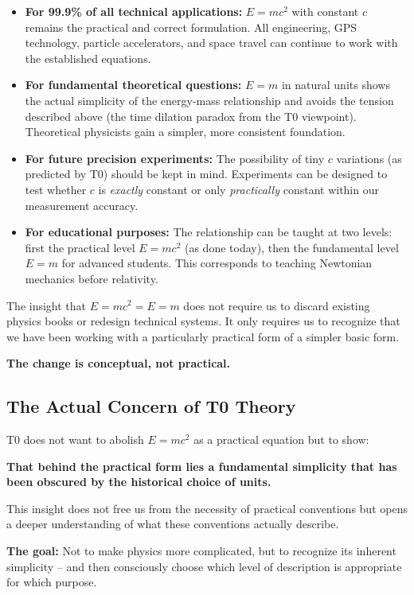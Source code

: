 	\begin{itemize}
		\item \textbf{For 99.9\% of all technical applications:} \( E = mc^2 \) with constant \( c \) remains the practical and correct formulation. All engineering, GPS technology, particle accelerators, and space travel can continue to work with the established equations.
		
		\item \textbf{For fundamental theoretical questions:} \( E = m \) in natural units shows the actual simplicity of the energy-mass relationship and avoids the tension described above (the time dilation paradox from the T0 viewpoint). Theoretical physicists gain a simpler, more consistent foundation.
		
		\item \textbf{For future precision experiments:} The possibility of tiny \( c \) variations (as predicted by T0) should be kept in mind. Experiments can be designed to test whether \( c \) is \textit{exactly} constant or only \textit{practically} constant within our measurement accuracy.
		
		\item \textbf{For educational purposes:} The relationship can be taught at two levels: first the practical level \( E = mc^2 \) (as done today), then the fundamental level \( E = m \) for advanced students. This corresponds to teaching Newtonian mechanics before relativity.
	\end{itemize}
	
	\begin{tcolorbox}[colback=yellow!10!white,colframe=yellow!75!black,title=The Peaceful Expansion]
		The insight that \( E = mc^2 = E = m \) does not require us to discard existing physics books or redesign technical systems. It only requires us to recognize that we have been working with a particularly practical form of a simpler basic form.
		
		\textbf{The change is conceptual, not practical.}
	\end{tcolorbox}
	
	\subsection{The Actual Concern of T0 Theory}
	
	\begin{tcolorbox}[colback=orange!10!white,colframe=orange!75!black,title=The Concern of T0 Theory]
		T0 does not want to abolish \( E = mc^2 \) as a practical equation but to show:
		
		\textbf{That behind the practical form lies a fundamental simplicity that has been obscured by the historical choice of units.}
		
		This insight does not free us from the necessity of practical conventions but opens a deeper understanding of what these conventions actually describe.
		
		\textbf{The goal:} Not to make physics more complicated, but to recognize its inherent simplicity – and then consciously choose which level of description is appropriate for which purpose.
	\end{tcolorbox}
	
